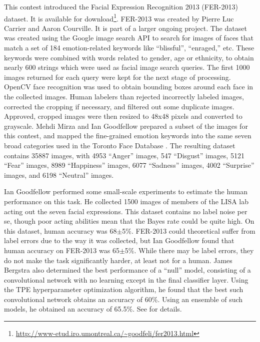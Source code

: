 \documentclass{llncs}
\begin{document}
This contest introduced the Facial Expression Recognition 2013 (FER-2013) dataset.
It is available for download\footnote{\tiny{\url{http://www-etud.iro.umontreal.ca/~goodfeli/fer2013.html}}}.
FER-2013 was created by Pierre Luc Carrier and Aaron Courville. It is part of a larger ongoing project.
The dataset was created using the Google image search API to search for
images of faces that match a set of 184 emotion-related keywords like ``blissful'', ``enraged,'' etc.
These keywords were combined with words related to gender, age or ethnicity,
to obtain nearly 600 strings which were used as facial image search queries. The first 1000 images returned for
each query were kept for the next stage of processing. 
OpenCV face recognition was used to obtain bounding boxes around each face in
the collected images.
Human labelers than rejected incorrectly labeled images, corrected the cropping if necessary, and filtered out some duplicate images.
Approved, cropped images were then resized to 48x48 pixels and converted to grayscale. Mehdi Mirza and Ian Goodfellow prepared
a subset of the images for this contest, and mapped the fine-grained emotion keywords into the same seven broad categories
used in the Toronto Face Database \citep{Susskind2010}. The resulting dataset contains 35887 images, with 4953 ``Anger'' images,
547 ``Disgust'' images, 5121 ``Fear'' images, 8989 ``Happiness'' images, 6077 ``Sadness'' images, 4002 ``Surprise'' images, and
6198 ``Neutral'' images.


Ian Goodfellow
performed some small-scale experiments to estimate the human performance on this task.
He collected 1500 images of members of the LISA lab acting out the seven facial expressions.
This dataset contains no label noise per se, though poor acting abilities mean that the Bayes
rate could be quite high. On this dataset, human accuracy was 68$\pm$5\%. FER-2013 could
theoretical suffer from label errors due to the way it was collected, but Ian Goodfellow found
that human accuracy on FER-2013 was 65$\pm$5\%. While there may be label errors, they do
not make the task significantly harder, at least not for a human. James Bergstra also determined
the best performance of a ``null'' model, consisting of a convolutional network with no learning
except in the final classifier layer. Using the TPE hyperparameter optimization algorithm, he found
that the best such convolutional network obtains an accuracy of 60\%. Using an ensemble of such models,
he obtained an accuracy of 65.5\%. See \citep{Bergstra-wkshp-2013} for details.
\end{document}
